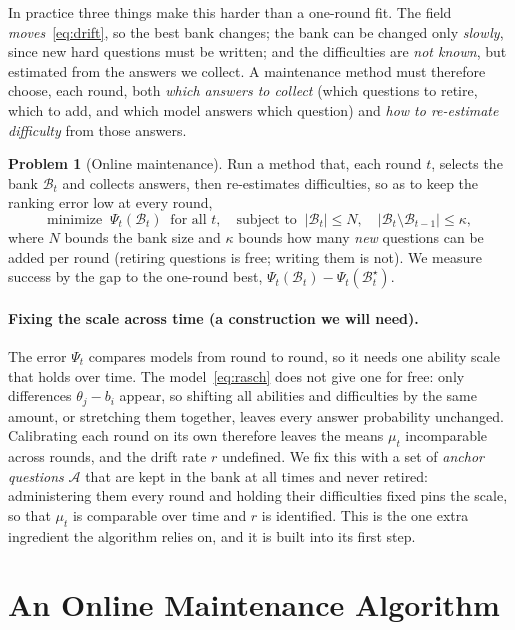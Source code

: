 \documentclass[11pt]{article}
\newcommand{\cB}{\mathcal{B}}
\newcommand{\cA}{\mathcal{A}}
\theoremstyle{plain}
\theoremstyle{definition}
\newtheorem{problem}{Problem}
\theoremstyle{remark}
\begin{document}
In practice three things make this harder than a one-round fit. The field
\emph{moves}~\eqref{eq:drift}, so the best bank changes; the bank can be changed only
\emph{slowly}, since new hard questions must be written; and the difficulties are
\emph{not known}, but estimated from the answers we collect. A maintenance method
must therefore choose, each round, both \emph{which answers to collect} (which
questions to retire, which to add, and which model answers which question) and
\emph{how to re-estimate difficulty} from those answers.

\begin{problem}[Online maintenance]
\label{prob:online}
Run a method that, each round $t$, selects the bank $\cB_t$ and collects answers,
then re-estimates difficulties, so as to keep the ranking error low at every round,
\begin{equation}
\text{minimize }\ \Psi_t(\cB_t)\ \text{ for all } t,\quad
\text{subject to }\ |\cB_t|\le N,\quad |\cB_t\setminus\cB_{t-1}|\le\kappa,
\label{eq:prob2}
\end{equation}
where $N$ bounds the bank size and $\kappa$ bounds how many \emph{new} questions can
be added per round (retiring questions is free; writing them is not). We measure
success by the gap to the one-round best, $\Psi_t(\cB_t)-\Psi_t(\cB^\star_t)$.
\end{problem}

\paragraph{Fixing the scale across time (a construction we will need).} The error
$\Psi_t$ compares models from round to round, so it needs one ability scale that
holds over time. The model~\eqref{eq:rasch} does not give one for free: only
differences $\theta_j-b_i$ appear, so shifting all abilities and difficulties by the
same amount, or stretching them together, leaves every answer probability unchanged.
Calibrating each round on its own therefore leaves the means $\mu_t$ incomparable
across rounds, and the drift rate $r$ undefined. We fix this with a set of
\emph{anchor questions} $\cA$ that are kept in the bank at all times and never
retired: administering them every round and holding their difficulties fixed pins
the scale, so that $\mu_t$ is comparable over time and $r$ is identified. This is the
one extra ingredient the algorithm relies on, and it is built into its first step.

\section{An Online Maintenance Algorithm}
\label{sec:algo}
\end{document}
